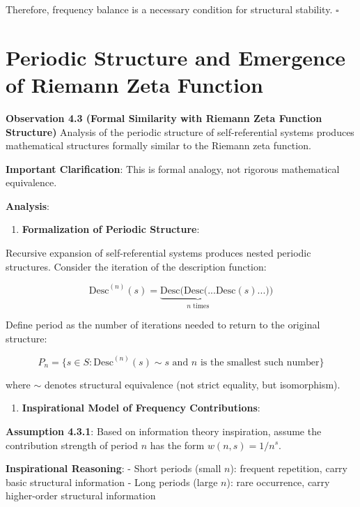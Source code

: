 Therefore, frequency balance is a necessary condition for structural stability. $\square$

\section{Periodic Structure and Emergence of Riemann Zeta Function}
\label{sec:ch04_riemann:periodic-structure-and-emergence-of-riemann-zeta-function}

\textbf{Observation 4.3 (Formal Similarity with Riemann Zeta Function Structure)}
\label{obs:4.3}
Analysis of the periodic structure of self-referential systems produces mathematical structures formally similar to the Riemann zeta function.

\textbf{Important Clarification}: This is formal analogy, not rigorous mathematical equivalence.

\textbf{Analysis}:

\begin{enumerate}
\item \textbf{Formalization of Periodic Structure}:
\end{enumerate}
   Recursive expansion of self-referential systems produces nested periodic structures. Consider the iteration of the description function:
   
\begin{equation}
\text{Desc}^{(n)}(s) = \underbrace{\text{Desc}(\text{Desc}(...\text{Desc}}_{n \text{ times}}(s)...))
\end{equation}
   
   Define period as the number of iterations needed to return to the original structure:
   
\begin{equation}
P_n = \{s \in S: \text{Desc}^{(n)}(s) \sim s \text{ and } n \text{ is the smallest such number}\}
\end{equation}
   
   where $\sim$ denotes structural equivalence (not strict equality, but isomorphism).

\begin{enumerate}
\item \textbf{Inspirational Model of Frequency Contributions}:
\end{enumerate}
   
   \textbf{Assumption 4.3.1}: Based on information theory inspiration, assume the contribution strength of period $n$ has the form $w(n,s) = 1/n^s$.
   
   \textbf{Inspirational Reasoning}:
   - Short periods (small $n$): frequent repetition, carry basic structural information
   - Long periods (large $n$): rare occurrence, carry higher-order structural information
   
